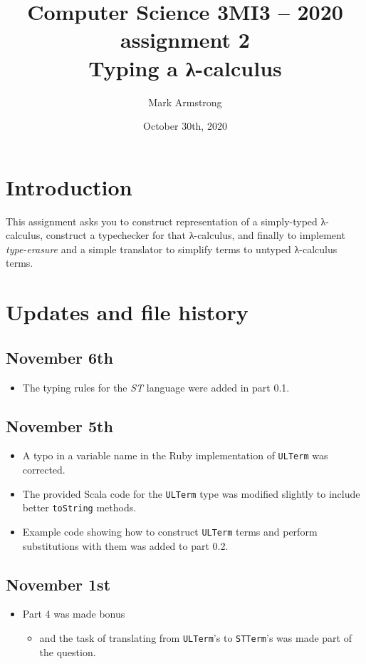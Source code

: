 \documentclass[11pt]{article}
\author{Mark Armstrong}
\date{October 30th, 2020}
\title{Computer Science 3MI3 – 2020 assignment 2\\\medskip
\large Typing a λ-calculus}
\theoremstyle{definition}
\begin{document}
\maketitle
\tableofcontents


\section*{Introduction}
\label{sec:orgb11ceaa}
This assignment asks you to construct representation
of a simply-typed λ-calculus, construct a typechecker for that
λ-calculus, and finally to implement \emph{type-erasure} and a
simple translator to simplify terms to untyped λ-calculus terms.

\section*{Updates and file history}
\label{sec:org6080328}
\subsection*{November 6th}
\label{sec:orga96d50c}
\begin{itemize}
\item The typing rules for the \emph{ST} language were added
in part 0.1.
\end{itemize}

\subsection*{November 5th}
\label{sec:org115e5ce}
\begin{itemize}
\item A typo in a variable name in the Ruby implementation
of \texttt{ULTerm} was corrected.
\item The provided Scala code for the \texttt{ULTerm} type was modified
slightly to include better \texttt{toString} methods.
\item Example code showing how to construct \texttt{ULTerm} terms
and perform substitutions with them was added to part 0.2.
\end{itemize}

\subsection*{November 1st}
\label{sec:org20a2efe}
\begin{itemize}
\item Part 4 was made bonus
\begin{itemize}
\item and the task of translating from \texttt{ULTerm}'s to \texttt{STTerm}'s was
made part of the question.
\end{itemize}
\end{itemize}
\end{document}
